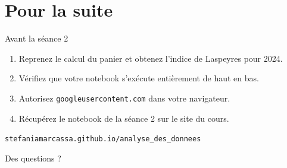 \documentclass[10pt,aspectratio=169]{beamer}
\begin{document}
\section{Pour la suite}

\begin{frame}{Avant la séance 2}
\begin{enumerate}
  \item Reprenez le calcul du panier et obtenez l'indice de Laspeyres pour 2024.
  \item Vérifiez que votre notebook s'exécute entièrement de haut en bas.
  \item Autorisez \texttt{googleusercontent.com} dans votre navigateur.
  \item Récupérez le notebook de la séance 2 sur le site du cours.
\end{enumerate}

\vspace{2em}
\begin{center}
\large \texttt{stefaniamarcassa.github.io/analyse\_des\_donnees}
\end{center}
\end{frame}

\begin{frame}[standout]
Des questions ?
\end{frame}
\end{document}
